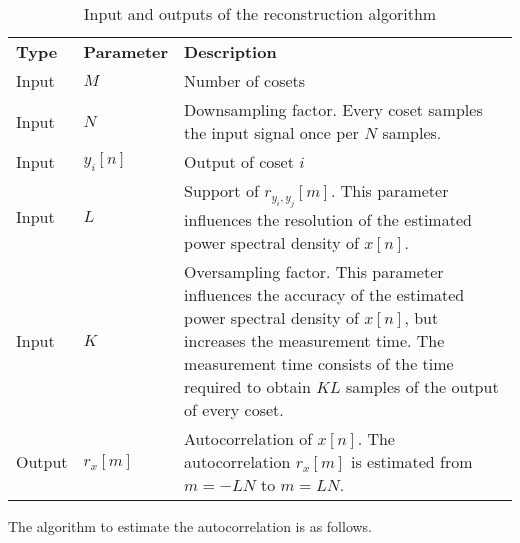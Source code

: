 \documentclass[a4paper, openany, oneside]{memoir}
\begin{document}
\begin{table}
    \centering
    \begin{tabularx}{\textwidth}{llY}
        \textbf{Type} & \textbf{Parameter} & \textbf{Description} \\
        Input & $M$ & Number of cosets \\
        Input & $N$ & Downsampling factor. Every coset samples the input signal once per $N$ samples. \\
        Input & $y_i[n]$ & Output of coset $i$ \\
        Input & $L$ & Support of $r_{y_i,y_j}[m]$. This parameter influences the resolution of the estimated power spectral density of $x[n]$. \\
        Input & $K$ & Oversampling factor. This parameter influences the accuracy of the estimated power spectral density of $x[n]$, but increases the measurement time. The measurement time consists of the time required to obtain $KL$ samples of the output of every coset. \\
        Output & $r_x[m]$ & Autocorrelation of $x[n]$. The autocorrelation $r_x[m]$ is estimated from $m=-LN$ to $m=LN$.
    \end{tabularx}
    \caption{Input and outputs of the reconstruction algorithm}
    \label{tab:reconstruction-algorithm-inputs-outputs}
\end{table}

The algorithm to estimate the autocorrelation is as follows.
\end{document}
